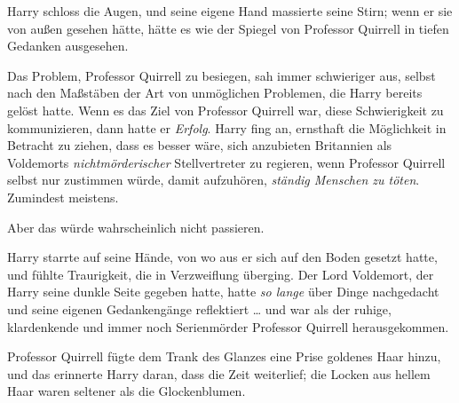 Harry schloss die Augen, und seine eigene Hand massierte seine Stirn; wenn er sie von außen gesehen hätte, hätte es wie der Spiegel von Professor Quirrell in tiefen Gedanken ausgesehen.

Das Problem, Professor Quirrell zu besiegen, sah immer schwieriger aus, selbst nach den Maßstäben der Art von unmöglichen Problemen, die Harry bereits gelöst hatte. Wenn es das Ziel von Professor Quirrell war, diese Schwierigkeit zu kommunizieren, dann hatte er \emph{Erfolg}.
Harry fing an, ernsthaft die Möglichkeit in Betracht zu ziehen, dass es besser wäre, sich anzubieten Britannien als Voldemorts \emph{nichtmörderischer} Stellvertreter zu regieren, wenn Professor Quirrell selbst nur zustimmen würde, damit aufzuhören, \emph{ständig Menschen zu töten}. Zumindest meistens.

Aber das würde wahrscheinlich nicht passieren.

Harry starrte auf seine Hände, von wo aus er sich auf den Boden gesetzt hatte, und fühlte Traurigkeit, die in Verzweiflung überging.
Der Lord Voldemort, der Harry seine dunkle Seite gegeben hatte, hatte \emph{so lange} über Dinge nachgedacht und seine eigenen Gedankengänge reflektiert … und war als der ruhige, klardenkende und immer noch Serienmörder Professor Quirrell herausgekommen.

Professor Quirrell fügte dem Trank des Glanzes eine Prise goldenes Haar hinzu, und das erinnerte Harry daran, dass die Zeit weiterlief; die Locken aus hellem Haar waren seltener als die Glockenblumen.

